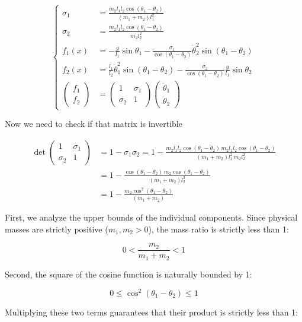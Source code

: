 \documentclass[11pt,a4paper]{article}
\begin{document}
\[
\left\{
\begin{aligned}
\sigma_1 &= \frac{m_2 l_1 l_2 \cos(\theta_1 - \theta_2)}{(m_1 + m_2) l_1^2} \\
\sigma_2 &= \frac{m_2 l_1 l_2 \cos(\theta_1 - \theta_2)}{m_2 l_2^2} \\
f_1(x) &= -\frac{g}{l_1} \sin\theta_1 - \frac{\sigma_1}{\cos(\theta_1 - \theta_2)} \dot{\theta}_2^2 \sin(\theta_1 - \theta_2) \\
f_2(x) &= \frac{l_1}{l_2} \dot{\theta}_1^2 \sin(\theta_1 - \theta_2) - \frac{\sigma_2}{\cos(\theta_1 - \theta_2)} \frac{g}{l_1} \sin\theta_2 \\
\begin{pmatrix} f_1 \\ f_2 \end{pmatrix} &= \begin{pmatrix} 1 & \sigma_1 \\ \sigma_2 & 1 \end{pmatrix} \begin{pmatrix} \ddot{\theta}_1 \\ \ddot{\theta}_2 \end{pmatrix}
\end{aligned}
\right.
\]

Now we need to check if that matrix is invertible

\begin{align*}
\det \begin{pmatrix} 1 & \sigma_1 \\ \sigma_2 & 1 \end{pmatrix} &= 1 - \sigma_1 \sigma_2 = 1 - \frac{m_2 l_1 l_2 \cos(\theta_1 - \theta_2) \, m_2 l_1 l_2 \cos(\theta_1 - \theta_2)}{(m_1 + m_2) l_1^2 \, m_2 l_2^2} \\
  &= 1 - \frac{\cos(\theta_1 - \theta_2) \, m_2 \cos(\theta_1 - \theta_2)}{(m_1 + m_2) l_2^2} \\
  &= 1 - \frac{m_2 \cos^2(\theta_1 - \theta_2)}{(m_1 + m_2)}
\end{align*}

First, we analyze the upper bounds of the individual components. Since physical masses are strictly positive ($m_1, m_2 > 0$), the mass ratio is strictly less than 1:

\[ 0 < \frac{m_2}{m_1 + m_2} < 1 \]

Second, the square of the cosine function is naturally bounded by 1:

\[ 0 \le \cos^2(\theta_1 - \theta_2) \le 1 \]

Multiplying these two terms guarantees that their product is strictly less than 1:
\end{document}
